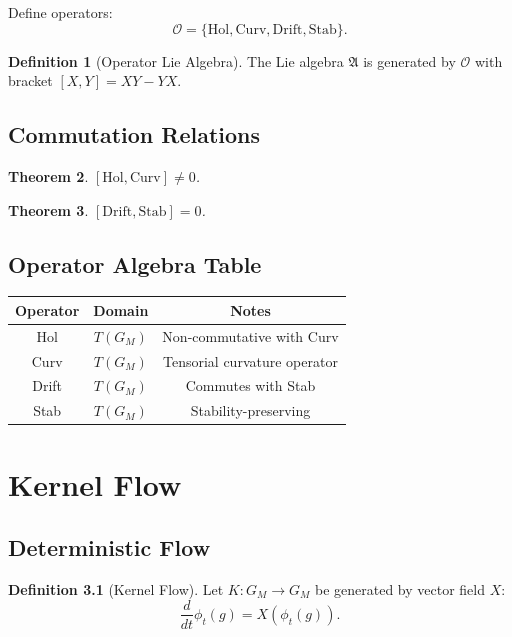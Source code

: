 \documentclass[11pt,oneside]{memoir}
\theoremstyle{definition}
\newtheorem{definition}{Definition}[chapter]
\theoremstyle{plain}
\newtheorem{theorem}[definition]{Theorem}
\theoremstyle{remark}
\begin{document}
Define operators:
\[
\mathcal{O} = \{\mathrm{Hol}, \mathrm{Curv}, \mathrm{Drift}, \mathrm{Stab}\}.
\]

\begin{definition}[Operator Lie Algebra]
The Lie algebra $\mathfrak{A}$ is generated by $\mathcal{O}$ with bracket 
$[X,Y] = XY - YX$.
\end{definition}

\section{Commutation Relations}

\begin{theorem}
$[\mathrm{Hol}, \mathrm{Curv}] \neq 0$.
\end{theorem}

\begin{theorem}
$[\mathrm{Drift}, \mathrm{Stab}] = 0$.
\end{theorem}

\section{Operator Algebra Table}

\begin{center}
\begin{tabular}{|c|c|c|}
\hline
Operator & Domain & Notes \\
\hline
Hol & $T(G_M)$ & Non-commutative with Curv \\
Curv & $T(G_M)$ & Tensorial curvature operator \\
Drift & $T(G_M)$ & Commutes with Stab \\
Stab & $T(G_M)$ & Stability-preserving \\
\hline
\end{tabular}
\end{center}

\chapter{Kernel Flow}

\section{Deterministic Flow}

\begin{definition}[Kernel Flow]
Let $K : G_M \to G_M$ be generated by vector field $X$:
\[
\frac{d}{dt} \phi_t(g) = X(\phi_t(g)).
\]
\end{definition}
\end{document}
